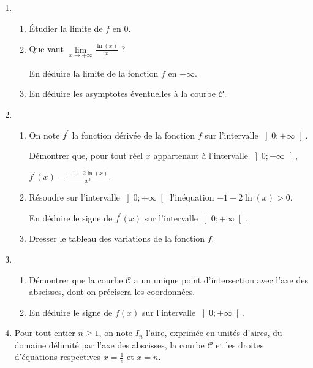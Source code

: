 \begin{enumerate}
     \item
     \begin{enumerate}[label=\alph*.]
          \item
          Étudier la limite de $f$ en $0$.
          \item
          Que vaut $\lim\limits_{x \rightarrow +\infty } \frac{\ln \left(x\right)}{x}$ ?
          \par
          En déduire la limite de la fonction $f$ en $+ \infty $.
          \item
          En déduire les asymptotes éventuelles à la courbe $\mathscr C$.
     \end{enumerate}
     \item
     \begin{enumerate}[label=\alph*.]
          \item
          On note $f^{\prime}$ la fonction dérivée de la fonction $f$ sur l'intervalle $\left]0 ;+\infty \right[$.
          \par
          Démontrer que, pour tout réel $x$ appartenant à l'intervalle $\left]0 ;+\infty \right[$,
          \par
          $f^{\prime}\left(x\right)=\frac{-1-2\ln \left(x\right)}{x^{3}}.$
          \item
          Résoudre sur l'intervalle $\left]0 ;+\infty \right[$ l'inéquation $-1-2\ln\left(x\right) > 0$.
          \par
          En déduire le signe de $f^{\prime}\left(x\right)$ sur l'intervalle $\left]0 ;+\infty \right[$.
          \item
          Dresser le tableau des variations de la fonction $f$.
     \end{enumerate}
     \item
     \begin{enumerate}[label=\alph*.]
          \item
          Démontrer que la courbe $\mathscr C$ a un unique point d'intersection avec l'axe des abscisses, dont on précisera les coordonnées.
          \item
          En déduire le signe de $f\left(x\right)$ sur l'intervalle $\left]0 ;+\infty \right[$.
     \end{enumerate}
     \item
     Pour tout entier $n \geqslant  1$, on note $I_{n}$ l'aire, exprimée en unités d'aires, du domaine délimité par l'axe des abscisses, la courbe $\mathscr C$ et les droites d'équations respectives $x=\frac{1}{e}$ et $x=n$.

\end{enumerate}
